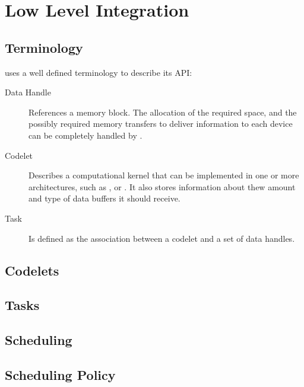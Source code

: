 \documentclass[main.tex]{subfiles}
\begin{document}
\section{Low Level Integration}

\subsection{Terminology}

\starpu uses a well defined terminology to describe its API:

\begin{description}
  \item[Data Handle] References a memory block. The allocation of the required space, and the possibly required memory transfers to deliver information to each device can be completely handled by \starpu.

  \item[Codelet] Describes a computational kernel that can be implemented in one or more architectures, such as \cpus, \cuda or \opencl. It also stores information about thew amount and type of data buffers it should receive.

  \item[Task] Is defined as the association between a codelet and a set of data handles.
\end{description}

\subsection{Codelets}

\subsection{Tasks}

\subsection{Scheduling}

\subsection{Scheduling Policy}
\end{document}
